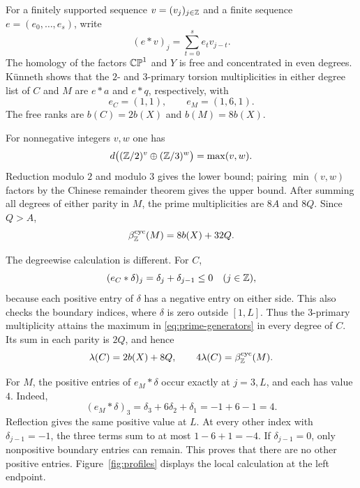 For a finitely supported sequence $v=(v_j)_{j\in\mathbb Z}$ and a finite
sequence $e=(e_0,\ldots,e_s)$, write
\[
 (e*v)_j=\sum_{t=0}^s e_t v_{j-t}.
\]
The homology of the factors $\mathbb {CP}^1$ and $Y$ is free and concentrated
in even degrees. K\"unneth shows that the $2$- and $3$-primary
torsion multiplicities in either degree list of $C$ and $M$ are
$e*a$ and $e*q$, respectively, with
\begin{equation}
 e_C=(1,1),\qquad e_M=(1,6,1).
 \label{eq:kernels}
\end{equation}
The free ranks are $b(C)=2b(X)$ and $b(M)=8b(X)$.

For nonnegative integers $v,w$ one has
\begin{equation}
 d\bigl((\mathbb Z/2)^v\oplus(\mathbb Z/3)^w\bigr)=\max(v,w).
 \label{eq:prime-generators}
\end{equation}
Reduction modulo $2$ and modulo $3$ gives the lower bound; pairing
$\min(v,w)$ factors by the Chinese remainder theorem gives the
upper bound. After summing all degrees of either parity in $M$, the
prime multiplicities are $8A$ and $8Q$. Since $Q>A$,
\begin{equation}
 \beta_{\mathbb Z}^{\mathrm{cyc}}(M)=8b(X)+32Q.
 \label{eq:beta-value}
\end{equation}

The degreewise calculation is different. For $C$,
\[
 (e_C*\delta)_j=\delta_j+\delta_{j-1}\leq0
 \quad(j\in\mathbb Z),
\]
because each positive entry of $\delta$ has a negative entry on
either side. This also checks the boundary indices, where $\delta$
is zero outside $[1,L]$. Thus the $3$-primary multiplicity attains
the maximum in \eqref{eq:prime-generators} in every degree of $C$.
Its sum in each parity is $2Q$, and hence
\begin{equation}
 \lambda(C)=2b(X)+8Q,
 \qquad 4\lambda(C)=\beta_{\mathbb Z}^{\mathrm{cyc}}(M).
 \label{eq:fixedcomponent-count}
\end{equation}

For $M$, the positive entries of $e_M*\delta$ occur exactly at
$j=3,L$, and each has value $4$. Indeed,
\[
 (e_M*\delta)_3=\delta_3+6\delta_2+\delta_1=-1+6-1=4.
\]
Reflection gives the same positive value at $L$. At every other
index with $\delta_{j-1}=-1$, the three terms sum to at most
$1-6+1=-4$. If $\delta_{j-1}=0$, only nonpositive boundary entries
can remain. This proves that there are no other positive entries.
Figure~\ref{fig:profiles} displays the local
calculation at the left endpoint.

